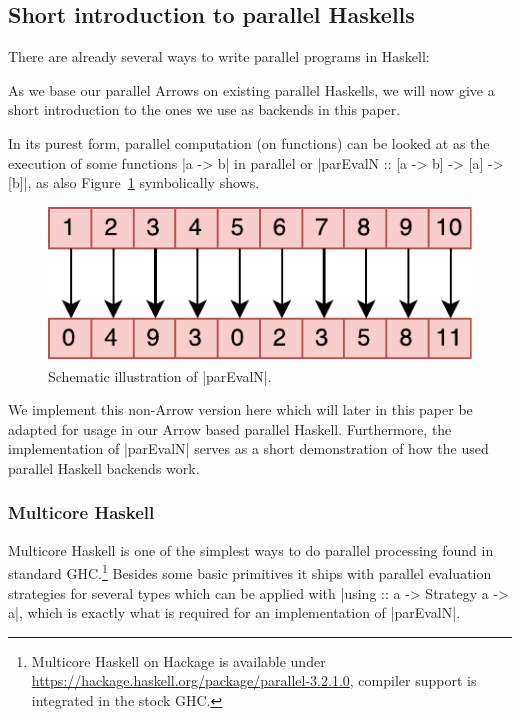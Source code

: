 \subsection{Short introduction to parallel Haskells}
\label{sec:parEvalNIntro}
There are already several ways to write parallel programs in Haskell:

\parallelHaskellOverview

As we base our parallel Arrows on existing parallel Haskells, we will now give a short introduction to the ones we use as backends in this paper.

In its purest form, parallel computation (on functions) can be looked at as the execution of some functions |a -> b| in parallel or |parEvalN :: [a -> b] -> [a] -> [b]|, as also Figure~\ref{fig:parEvalN} symbolically shows.
\begin{figure}[t]
  \centering
	\includegraphics[scale=0.7]{images/parEvalN}
	\caption{Schematic illustration of |parEvalN|.}
	\label{fig:parEvalN}
\end{figure}
We implement this non-Arrow version here which will later in this paper be adapted for usage in our Arrow based parallel Haskell. Furthermore, the implementation of |parEvalN| serves as a short demonstration of how the used parallel Haskell backends work.

\subsubsection{Multicore Haskell}
Multicore Haskell \cite{Marlow2009,Trinder1998a} is one of the simplest ways to do parallel processing found in standard GHC.\footnote{Multicore Haskell on Hackage is available under \url{https://hackage.haskell.org/package/parallel-3.2.1.0}, compiler support is integrated in the stock GHC.} Besides some basic primitives it ships with parallel evaluation strategies for several types which can be applied with |using :: a -> Strategy a -> a|, which is exactly what is required for an implementation of |parEvalN|.


